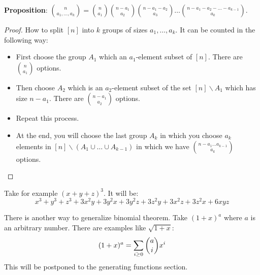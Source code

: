 \documentclass{report}
\begin{document}
\textbf{Proposition}: $\binom{n}{a_{1}, \ldots, a_{k}} = \binom{n}{a_{1}}\binom{n - a_{1}}{a_{2}}\binom{n - a_{1} - a_{2}}{a_{3}} \ldots \binom{n - a_{1} - a_{2} - \ldots - a_{k - 1}}{a_{k}}$.
    \begin{proof}
        How to split $[n]$ into $k$ groups of sizes $a_{1}, \ldots, a_{k}$. It can be counted in the following way:
            \begin{itemize}
                \item First choose the group $A_{1}$ which an $a_{1}$-element subset of $[n]$. There are $\binom{n}{a_{1}}$ options.

                \item Then choose $A_{2}$ which is an $a_{2}$-element subset of the set $[n]\backslash A_{1}$ which has size $n - a_{1}$. There are $\binom{n - a_{1}}{a_{2}}$ options.

                \item Repeat this process.

                \item At the end, you will choose the last group $A_{k}$ in which you choose $a_{k}$ elements in $[n]\backslash (A_{1} \cup \ldots \cup A_{k - 1})$ in which we have $\binom{n - a_{1} \ldots a_{k - 1}}{a_{k}}$ options.
            \end{itemize}
    \end{proof}

\begin{examples}
    \begin{example}
        Take for example $(x + y + z)^{3}$. It will be:
            \begin{equation*}
                x^{3} + y^{3} + z^{3} + 3x^{2}y + 3y^{2}x + 3y^{2}z + 3z^{2}y + 3x^{2}z + 3z^{2}x + 6xyz
            \end{equation*}
    \end{example}
\end{examples}

There is another way to generalize binomial theorem. Take $(1 + x)^{a}$ where $a$ is an arbitrary number. There are examples like $\sqrt{1 + x}$:
    \begin{equation*}
        (1 + x)^{a} = \sum_{i \geq 0}^{} \dbinom{a}{i}x^{i}
    \end{equation*}
This will be postponed to the generating functions section.
\end{document}
